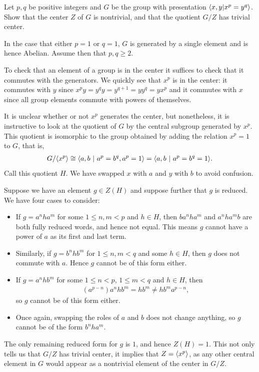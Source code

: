 \begin{homework}[e]
	\prob Let $p,q$ be positive integers and $G$ be the group with presentation $\langle x,y|x^p=y^q\rangle$. Show that the center $Z$ of $G$ is nontrivial, and that the quotient $G/Z$ has trivial center.
	\begin{prf}
		In the case that either $p = 1$ or $q = 1$, $G$ is generated by a single element and is hence Abelian. Assume then that $p,q \geq 2$.

		To check that an element of a group is in the center it suffices to check that it commutes with the generators. We quickly see that $x^p$ is in the center: it commutes with $y$ since $x^py = y^qy = y^{q+1} = yy^q = yx^p$ and it commutes with $x$ since all group elements commute with powers of themselves. 

		It is unclear whether or not $x^p$ generates the center, but nonetheless, it is instructive to look at the quotient of $G$ by the central subgroup generated by $x^p$. This quotient is isomorphic to the group obtained by adding the relation $x^p = 1$ to $G$, that is,
		\begin{align*}
			G/\langle x^p\rangle \cong \langle a,b ~|~ a^p = b^q, a^p = 1\rangle = \langle a,b ~|~ a^p = b^q = 1\rangle.
		\end{align*}
		Call this quotient $H$. We have swapped $x$ with $a$ and $y$ with $b$ to avoid confusion.

		\bigskip

		Suppose we have an element $g \in Z(H)$ and suppose further that $g$ is reduced. We have four cases to consider:
		\begin{itemize}
			\item If $g = a^nha^m$ for some $1\leq n,m < p$ and $h \in H$, then $ba^nha^m$ and $a^nha^mb$ are both fully reduced words, and hence not equal. This means $g$ cannot have a power of $a$ as its first and last term.
			\item Similarly, if $g = b^nhb^m$ for $1\leq n,m < q$ and some $h \in H$, then $g$ does not commute with $a$. Hence $g$ cannot be of this form either.
			\item If $g = a^nhb^m$ for some $1 \leq n < p$, $1\leq m < q$ and $h \in H$, then
				\begin{align*}
					(a^{p - n})a^nhb^m = hb^m \neq hb^ma^{p - n},
				\end{align*}
				so $g$ cannot be of this form either.
			\item Once again, swapping the roles of $a$ and $b$ does not change anything, so $g$ cannot be of the form $b^nha^m$.
		\end{itemize}
		The only remaining reduced form for $g$ is $1$, and hence $Z(H) = 1$. This not only tells us that $G/Z$ has trivial center, it implies that $Z = \langle x^p\rangle$, as any other central element in $G$ would appear as a nontrivial element of the center in $G/Z$.
	\end{prf}


\end{homework}
